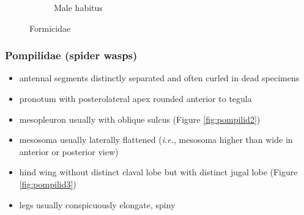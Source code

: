 \documentclass[letterpaper, 11pt]{article}
\begin{document}
\begin{figure}[ht!]
\begin{subfigure}[ht!]{0.35\textwidth}
        \caption{Male habitus \citep[][Fig. 92]{goulet1993hymenoptera}}
        \label{fig:formicid2}
    \end{subfigure}
    \caption{Formicidae}\label{fig:formicids}
\end{figure}

\subsubsection{Pompilidae (spider wasps)}
\begin{itemize}
\item antennal segments distinctly separated and often curled in dead specimens
\item pronotum with posterolateral apex rounded anterior to tegula
\item mesopleuron usually with oblique sulcus (Figure \ref{fig:pompilid2})
\item mesosoma usually laterally flattened (\textit{i.e.}, mesosoma higher than wide in anterior or posterior view)
\item hind wing without distinct claval lobe but with distinct jugal lobe (Figure \ref{fig:pompilid3})
\item legs usually conspicuously elongate, spiny 
\end{itemize}
\end{document}
